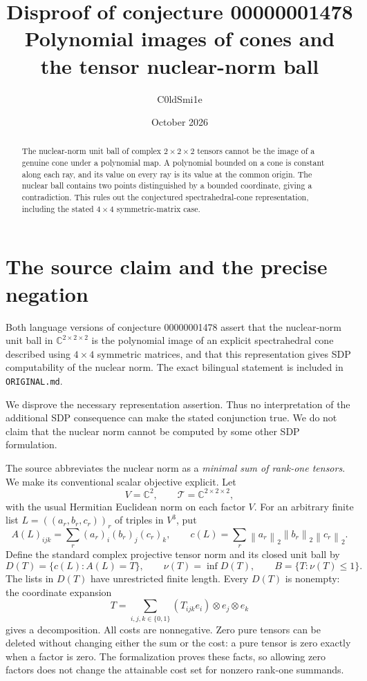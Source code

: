\documentclass[11pt]{article}
\title{Disproof of conjecture 00000001478\\
\large Polynomial images of cones and the tensor nuclear-norm ball}
\author{C0ldSmi1e}
\date{October 2026}
\newcommand{\C}{\mathbb C}
\newcommand{\nn}[1]{\left\lVert #1\right\rVert_2}
\begin{document}
\maketitle

\begin{abstract}
The nuclear-norm unit ball of complex \(2\times2\times2\) tensors cannot
be the image of a genuine cone under a polynomial map. A polynomial
bounded on a cone is constant along each ray, and its value on every
ray is its value at the common origin. The nuclear ball contains two
points distinguished by a bounded coordinate, giving a contradiction.
This rules out the conjectured spectrahedral-cone representation,
including the stated \(4\times4\) symmetric-matrix case.
\end{abstract}

\section{The source claim and the precise negation}

Both language versions of conjecture 00000001478 assert that the
nuclear-norm unit ball in \(\C^{2\times2\times2}\) is the polynomial
image of an explicit spectrahedral cone described using \(4\times4\)
symmetric matrices, and that this representation gives SDP computability
of the nuclear norm. The exact bilingual statement is included in
\texttt{ORIGINAL.md}.

We disprove the necessary representation assertion. Thus no interpretation
of the additional SDP consequence can make the stated conjunction true.
We do not claim that the nuclear norm cannot be computed by some other SDP
formulation.

The source abbreviates the nuclear norm as a \emph{minimal sum of rank-one
tensors}. We make its conventional scalar objective explicit. Let
\[
 V=\C^2,\qquad \mathcal T=\C^{2\times2\times2},
\]
with the usual Hermitian Euclidean norm on each factor \(V\).
For an arbitrary finite list \(L=((a_r,b_r,c_r))_r\) of triples in \(V^3\), put
\[
 A(L)_{ijk}=\sum_r (a_r)_i(b_r)_j(c_r)_k,\qquad
 c(L)=\sum_r \nn{a_r}\nn{b_r}\nn{c_r}.
\]
Define the standard complex projective tensor norm and its closed unit ball by
\[
 D(T)=\{c(L):A(L)=T\},\qquad
 \nu(T)=\inf D(T),\qquad B=\{T:\nu(T)\leq1\}.
\]
The lists in \(D(T)\) have unrestricted finite length. Every \(D(T)\) is
nonempty: the coordinate expansion
\[
 T=\sum_{i,j,k\in\{0,1\}}(T_{ijk}e_i)\otimes e_j\otimes e_k
\]
gives a decomposition. All costs are nonnegative.
Zero pure tensors can be deleted without changing either the sum or the
cost: a pure tensor is zero exactly when a factor is zero.
The formalization proves these facts, so allowing zero factors does not
change the attainable cost set for nonzero rank-one summands.
\end{document}
